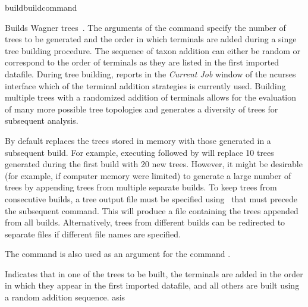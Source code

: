 \begin{command}{build}{buildcommand}

	
 	\begin{poydescription}
        Builds Wagner trees~\cite{farris1970}. The arguments of the command
         specify the number of trees to be generated and
        the order in which terminals are added during a singe tree building procedure. The
        sequence of taxon addition can either be random or correspond to the
        order of terminals as they are listed in the first imported datafile. During tree
        building, \poy reports in the \emph{Current Job} window of the ncurses interface
        which of the terminal addition strategies is currently used.
        Building multiple trees with a randomized addition of terminals allows for
        the evaluation of many more possible tree topologies and generates a
        diversity of trees for subsequent analysis.

        By default \poy replaces the trees stored in memory with those generated
        in a subsequent build. For example, executing 
        followed by  will replace 10 trees generated
        during the first build with 20 new trees. However, it might be desirable
        (for example, if computer memory were limited) to generate a large number of trees by
        appending trees from multiple separate builds. To keep trees from consecutive
        builds, a tree output file must be specified using~ that must 
        precede the subsequent  command. This will produce a file
        containing the trees appended from all builds. Alternatively, trees from different
        builds can be redirected to separate files if different file names are specified.
        
        The command  is also used as
        an argument for the command .
   	\end{poydescription}

	\begin{arguments}

            {Indicates that in one of the trees to be built, the terminals are
            added in the order in which they appear in the first 
            imported datafile, and all others are built using a random addition
            sequence.}
            {asis}


\end{arguments}
\end{command}
